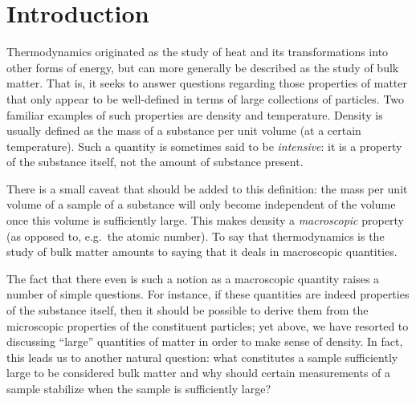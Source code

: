 \chapter{Introduction}
\label{sec:intro}

\setcounter{footnote}{0}


Thermodynamics originated as the study of heat and its transformations into other
forms of energy, but can more generally be described as the study of bulk matter.
That is, it seeks to answer questions regarding those properties of matter that
only appear to be well-defined in terms of large collections of particles. Two
familiar examples of such properties are density and temperature. Density is usually
defined as the mass of a substance per unit volume (at a certain temperature).
Such a quantity is sometimes said to be \emph{intensive}: it is a property of
the substance itself, not the amount of substance present.

There is a small caveat that should be added to this definition: the mass per unit
volume of a sample of a substance will only become independent of the volume once
this volume is sufficiently large. This makes density a \emph{macroscopic} property
(as opposed to, e.g.\ the atomic number). To say that thermodynamics is the study
of bulk matter amounts to saying that it deals in macroscopic quantities.

The fact that there even is such a notion as a macroscopic quantity
raises a number of simple questions. For instance, if these quantities
are indeed properties of the substance itself, then it should be possible to 
derive them from the microscopic properties of the constituent particles;
yet above, we have resorted to discussing ``large'' quantities of matter in order
to make sense of density. In fact, this leads us to another natural question: what
constitutes a sample sufficiently large to be considered bulk matter and why should
certain measurements of a sample stabilize when the sample is sufficiently large?

